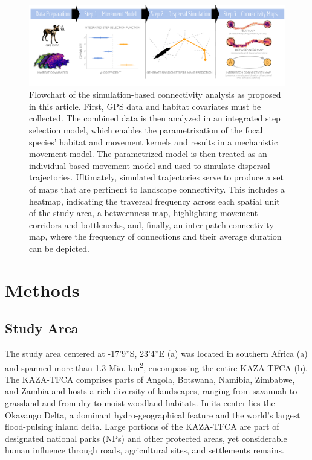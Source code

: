 \documentclass[abstract=on,10pt,a4paper,bibliography=totocnumbered]{article}
\begin{document}
\begin{figure}[htbp]
  \begin{center}
    \includegraphics[width = \textwidth]{99_GraphicalAbstract2.pdf}
    \caption{Flowchart of the simulation-based connectivity analysis as proposed
    in this article. First, GPS data and habitat covariates must be
    collected. The combined data is then analyzed in an integrated step
    selection model, which enables the parametrization of the focal species'
    habitat and movement kernels and results in a mechanistic movement model.
    The parametrized model is then treated as an individual-based movement model
    and used to simulate dispersal trajectories. Ultimately, simulated
    trajectories serve to produce a set of maps that are pertinent to landscape
    connectivity. This includes a heatmap, indicating the traversal frequency
    across each spatial unit of the study area, a betweenness map, highlighting
    movement corridors and bottlenecks, and, finally, an inter-patch
    connectivity map, where the frequency of connections and their average
    duration can be depicted.}
    \label{GraphicalAbstract}
  \end{center}
\end{figure}

\section{Methods}
\subsection{Study Area}
The study area centered at -17'9''S, 23'4''E
(a) was located in southern Africa (a) and
spanned more than 1.3 Mio. km\textsuperscript{2}, encompassing the entire
KAZA-TFCA (b). The KAZA-TFCA comprises parts of Angola,
Botswana, Namibia, Zimbabwe, and Zambia and hosts a rich diversity of
landscapes, ranging from savannah to grassland and from dry to moist woodland
habitats. In its center lies the Okavango Delta, a dominant hydro-geographical
feature and the world's largest flood-pulsing inland delta. Large portions of
the KAZA-TFCA are part of designated national parks (NPs) and other protected
areas, yet considerable human influence through roads, agricultural sites, and
settlements remains.
\end{document}
